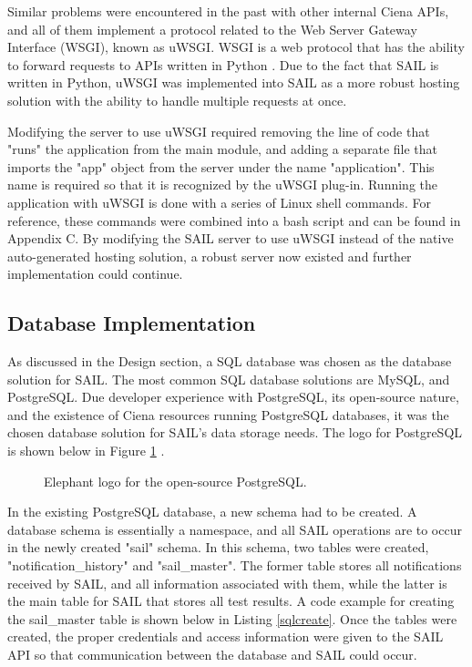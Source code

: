 \documentclass[10pt, titlepage, onecolumn, openany]{article}
\begin{document}
Similar problems were encountered in the past with other internal Ciena
APIs, and all of them implement a protocol related to the Web Server
Gateway Interface (WSGI), known as uWSGI. WSGI is a web protocol that
has the ability to forward requests to APIs written in Python
\cite{uwsgi}. Due to the fact that SAIL is written in Python, uWSGI
was implemented into SAIL as a more robust hosting solution with the
ability to handle multiple requests at once.

Modifying the server to use uWSGI required removing the line of code that
"runs" the application from the main module, and adding a separate file
that imports the "app" object from the server under the name "application". This
name is required so that it is recognized by the uWSGI plug-in. Running
the application with uWSGI is done with a series of Linux shell commands. For
reference, these commands were combined into a bash script and can be found in
Appendix C. By modifying the SAIL server to use uWSGI instead of the native
auto-generated hosting solution, a robust server now existed and further
implementation could continue.

\subsection{Database Implementation}
As discussed in the Design section, a SQL database was chosen as the database
solution for SAIL. The most common SQL database solutions are MySQL, and PostgreSQL.
Due developer experience with PostgreSQL, its open-source nature, and the
existence of Ciena resources running PostgreSQL databases, it was the
chosen database solution for SAIL's data storage needs. The logo for PostgreSQL
is shown below in Figure \ref{psql} \cite{psqllogo}.

\begin{figure}[H]
\centering
{}
\caption{Elephant logo for the open-source PostgreSQL.}
\label{psql}
\end{figure}

In the existing PostgreSQL database, a new schema had to be created. A database
schema is essentially a namespace, and all SAIL operations are to occur in the
newly created "sail" schema. In this schema, two tables were created,
"notification\_history" and "sail\_master". The former table stores all notifications
received by SAIL, and all information associated with them, while the latter is
the main table for SAIL that stores all test results. A code example for creating
the sail\_master table is shown below in Listing \ref{sqlcreate}. Once the tables
were created, the proper credentials and access information were given to the SAIL
API so that communication between the database and SAIL could occur.
\end{document}
